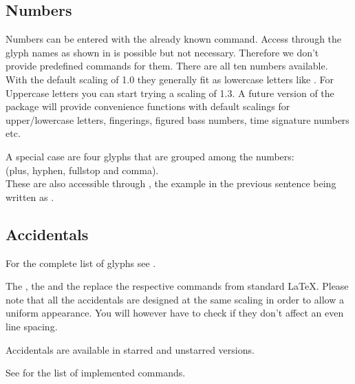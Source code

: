 \documentclass{article}
\begin{document}
\subsection{Numbers}
\label{subsec:numbers}
Numbers can be entered with the already known  command. 
Access through the glyph names as shown in  is possible but not necessary.
Therefore we don't provide predefined commands for them.
There are all ten numbers available. 
With the default scaling of 1.0 they generally fit as lowercase letters like  . 
For Uppercase letters you can start trying a scaling of 1.3. A future version of the package will provide convenience functions with default scalings for upper/lowercase letters, fingerings, figured bass numbers, time signature numbers etc.

A special case are four glyphs that are grouped among the numbers:\\
 (plus, hyphen, fullstop and comma). \\
These are also accessible through , the example in the previous sentence being written as .

\subsection{Accidentals}
\label{subsec:accidentals}
For the complete list of glyphs see .

The  \natural*, the  \flat and the  \sharp replace the respective commands from standard \LaTeX. 
Please note that all the accidentals are designed at the same scaling in order to allow a uniform appearance. You will however have to check if they don't affect an even line spacing.

Accidentals are available in starred and unstarred versions.

See  for the list of implemented commands. 
\end{document}
